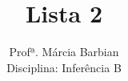 \documentclass[10pt,brazil,addpoints]{exam}
\begin{document}
\title{Lista 2}


\author{
  Profª. Márcia Barbian \\
  Disciplina: Inferência B\\
  \date{}
}


\maketitle
\end{document}
